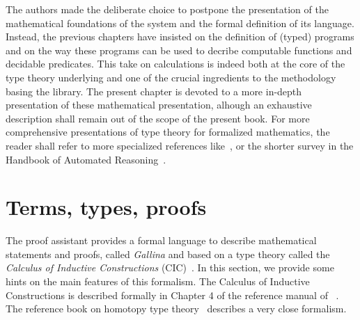 \label{ch:ttch}

The authors made the deliberate choice to postpone the presentation of
the mathematical foundations of the \Coq{} system and the formal
definition of its language. Instead, the previous chapters have
insisted on the definition of (typed) programs and on the way these
programs can be used to decribe computable functions and decidable
predicates. This take on calculations is indeed both at the core of
the type theory underlying \Coq{} and one of the crucial ingredients
to the methodology basing the \mcbMC{} library. The present chapter is
devoted to a more in-depth presentation of these mathematical
presentation, alhough an exhaustive description shall remain out of
the scope of the present book. For more comprehensive presentations of
type theory for formalized mathematics, the reader shall refer to more
specialized references like~\cite{ttfp}, or the
shorter survey in the Handbook of Automated
Reasoning~\cite[Volume 2, chapter 18]{handbook-ar}.

\section{Terms, types, proofs}\label{sec:chi}

The \Coq{} proof assistant provides a formal language to describe
mathematical statements and proofs, called
\emph{Gallina} and based on a type theory called the
\emph{Calculus of Inductive
  Constructions} (CIC)~\cite{coquand:huet:88,CoPa89}. In this section, we
provide some hints on the main features of this formalism. The
Calculus of Inductive Constructions is described formally in Chapter 4
of the reference manual of \Coq{}~\cite{Coq:manual}. The reference book on
homotopy type theory~\cite{hottbook} describes a very close formalism.



